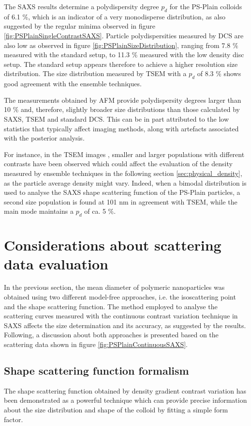 The SAXS results determine a polydispersity degree $p_d$ for the PS-Plain colloids of 6.1 $\%$, which is an indicator of a very monodisperse distribution, as also suggested by the regular minima observed in figure \ref{fig:PSPlainSingleContrastSAXS}. Particle polydispersities measured by DCS are also low as observed in figure \ref{fig:PSPlainSizeDistribution}, ranging from 7.8 $\%$ measured with the standard setup, to 11.3 $\%$ measured with the low density disc setup. The standard setup appears therefore to achieve a higher resolution size distribution. The size distribution measured by TSEM with a $p_d$ of 8.3 $\%$ shows good agreement with the ensemble techniques.

The measurements obtained by AFM provide polydispersity degrees larger than 10 $\%$ \citep{nicolet_inter-laboratory_2016} and, therefore, slightly broader size distributions than those calculated by SAXS, TSEM and standard DCS. This can be in part attributed to the low statistics that typically affect imaging methods, along with artefacts associated with the posterior analysis.

For instance, in the TSEM images \citep{nicolet_inter-laboratory_2016}, smaller and larger populations with different contrasts have been observed which could affect the evaluation of the density measured by ensemble techniques in the following section \ref{sec:physical_density}, as the particle average density might vary. Indeed, when a bimodal distribution is used to analyse the SAXS shape scattering function of the PS-Plain particles, a second size population is found at 101 nm in agreement with TSEM, while the main mode maintains a $p_d$ of ca. 5 $\%$.

\section{Considerations about scattering data evaluation}

In the previous section, the mean diameter of polymeric nanoparticles was obtained using two different model-free approaches, i.e. the isoscattering point and the shape scattering function. The method employed to analyse the scattering curves measured with the continuous contrast variation technique in SAXS affects the size determination and its accuracy, as suggested by the results. Following, a discussion about both approaches is presented based on the scattering data shown in figure \ref{fig:PSPlainContinuousSAXS}.

\subsection{Shape scattering function formalism}
The shape scattering function obtained by density gradient contrast variation has been demonstrated as a powerful technique which can provide precise information about the size distribution and shape of the colloid by fitting a simple form factor.


